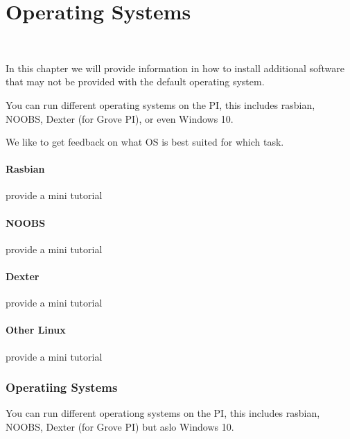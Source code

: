 \chapter{Operating Systems}

\FILENAME\

In this chapter we will provide information in how to install additional software that may not be provided with the default operating system.

You can run different operating systems on the PI, this includes 
rasbian, NOOBS, Dexter (for Grove PI), or even Windows 10.

We like to get feedback on what OS is best suited for which task.

\subsubsection{Rasbian}

\begin{exercise}
provide a mini tutorial 
\end{exercise}

\subsubsection{NOOBS}

\begin{exercise}
provide a mini tutorial 
\end{exercise}

\subsubsection{Dexter}

\begin{exercise}
provide a mini tutorial 
\end{exercise}

\subsubsection{Other Linux}

\begin{exercise}
provide a mini tutorial 
\end{exercise}

\subsection{Operatiing Systems}

You can run different operationg systems on the PI, this includes 
rasbian, NOOBS, Dexter (for Grove PI) but aslo Windows 10.

